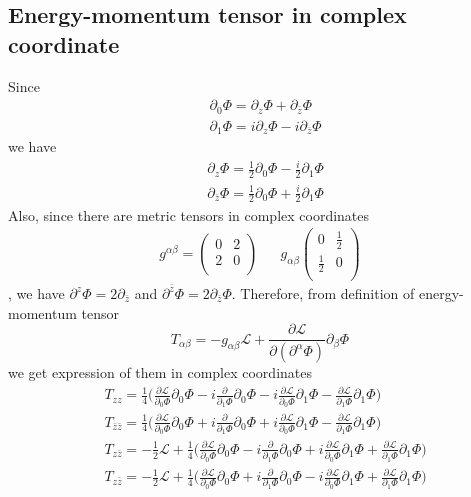 \documentclass[11pt,a4paper]{article}
\theoremstyle{definition}
\begin{document}
	\subsection{Energy-momentum tensor in complex coordinate}
	Since 
	\[
	\begin{aligned}
	&\partial_0 \Phi = \partial_z \Phi + \partial_{\bar{z}}\Phi\\&\partial_1 \Phi = i\partial_z \Phi - i \partial_{\bar{z}}\Phi
	\end{aligned}
	\]
	we have \[
	\begin{aligned}
	&\partial_z \Phi =\frac{1}{2} \partial_0 \Phi - \frac{i}{2} \partial_1 \Phi\\& \partial_{\bar{z}} \Phi = \frac{1}{2} \partial_0 \Phi+ \frac{i}{2} \partial_1 \Phi
	\end{aligned}
	\] 
	Also, since there are metric tensors in complex coordinates
	\[
	\begin{aligned}
	g^{\alpha \beta}= \begin{pmatrix}
	0&2 \\
	2&0\\
	\end{pmatrix}& &g_{\alpha \beta}\begin{pmatrix}
	0& \frac{1}{2}\\
	\frac{1}{2}& 0\\
	\end{pmatrix}
	\end{aligned}
	\],
	we have $\partial^z \Phi = 2 \partial_{\bar{z}}$ and $\partial^{\bar{z}} \Phi = 2\partial_{\bar{z}} \Phi$. Therefore, from definition of energy-momentum tensor
	\[T_{\alpha \beta}= - g_{\alpha \beta} \mathcal{L}+ \frac{\partial \mathcal{L}}{\partial (\partial^\alpha \Phi)} \partial_\beta \Phi
	\] we get expression of them in complex coordinates
	\[
	\begin{aligned}
	&T_{zz} = \frac{1}{4}\big( \frac{\partial \mathcal{L}}{\partial_0 \Phi} \partial_0 \Phi - i \frac{\partial}{\partial_1 \Phi} \partial_0 \Phi - i \frac{\partial \mathcal{L}}{\partial_0 \Phi} \partial_1 \Phi - \frac{\partial \mathcal{L}}{\partial_1 \Phi} \partial_1 \Phi\big)\\
	&T_{\bar{z}\bar{z}} = \frac{1}{4}\big( \frac{\partial \mathcal{L}}{\partial_0 \Phi} \partial_0 \Phi + i \frac{\partial}{\partial_1 \Phi} \partial_0 \Phi + i \frac{\partial \mathcal{L}}{\partial_0 \Phi} \partial_1 \Phi - \frac{\partial \mathcal{L}}{\partial_1 \Phi} \partial_1 \Phi \big)\\
	&T_{z \bar{z}} = - \frac{1}{2} \mathcal{L} + \frac{1}{4} \big( \frac{\partial \mathcal{L}}{\partial_0 \Phi} \partial_0 \Phi - i \frac{\partial}{\partial_1 \Phi} \partial_0 \Phi + i \frac{\partial \mathcal{L}}{\partial_0 \Phi} \partial_1 \Phi + \frac{\partial \mathcal{L}}{\partial_1 \Phi} \partial_1 \Phi\big)\\
	&T_{z \bar{z}} = - \frac{1}{2} \mathcal{L} + \frac{1}{4} \big( \frac{\partial \mathcal{L}}{\partial_0 \Phi} \partial_0 \Phi + i \frac{\partial}{\partial_1 \Phi} \partial_0 \Phi - i \frac{\partial \mathcal{L}}{\partial_0 \Phi} \partial_1 \Phi + \frac{\partial \mathcal{L}}{\partial_1 \Phi} \partial_1 \Phi\big)\\
	\end{aligned}
	\]
\end{document}
